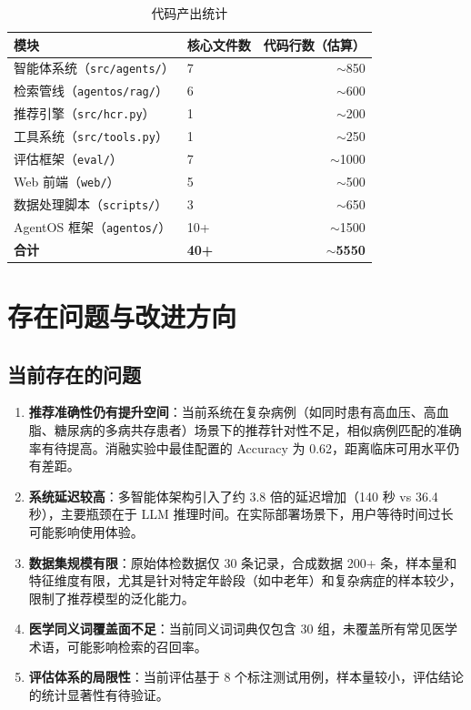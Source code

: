 \documentclass[12pt,a4paper]{article}
\begin{document}
\begin{table}[H]
    \centering
    \caption{代码产出统计}
    \label{tab:code}
    \begin{tabular}{llr}
        \toprule
        \textbf{模块} & \textbf{核心文件数} & \textbf{代码行数（估算）} \\
        \midrule
        智能体系统（\texttt{src/agents/}） & 7 & $\sim$850 \\
        检索管线（\texttt{agentos/rag/}） & 6 & $\sim$600 \\
        推荐引擎（\texttt{src/hcr.py}） & 1 & $\sim$200 \\
        工具系统（\texttt{src/tools.py}） & 1 & $\sim$250 \\
        评估框架（\texttt{eval/}） & 7 & $\sim$1000 \\
        Web 前端（\texttt{web/}） & 5 & $\sim$500 \\
        数据处理脚本（\texttt{scripts/}） & 3 & $\sim$650 \\
        AgentOS 框架（\texttt{agentos/}） & 10+ & $\sim$1500 \\
        \midrule
        \textbf{合计} & \textbf{40+} & \textbf{$\sim$5550} \\
        \bottomrule
    \end{tabular}
\end{table}




\section{存在问题与改进方向}
\label{sec:future}

\subsection{当前存在的问题}

\begin{enumerate}[leftmargin=2em]
    \item \textbf{推荐准确性仍有提升空间}：当前系统在复杂病例（如同时患有高血压、高血脂、糖尿病的多病共存患者）场景下的推荐针对性不足，相似病例匹配的准确率有待提高。消融实验中最佳配置的 Accuracy 为 0.62，距离临床可用水平仍有差距。
    \item \textbf{系统延迟较高}：多智能体架构引入了约 3.8 倍的延迟增加（140 秒 vs 36.4 秒），主要瓶颈在于 LLM 推理时间。在实际部署场景下，用户等待时间过长可能影响使用体验。
    \item \textbf{数据集规模有限}：原始体检数据仅 30 条记录，合成数据 200+ 条，样本量和特征维度有限，尤其是针对特定年龄段（如中老年）和复杂病症的样本较少，限制了推荐模型的泛化能力。
    \item \textbf{医学同义词覆盖面不足}：当前同义词词典仅包含 30 组，未覆盖所有常见医学术语，可能影响检索的召回率。
    \item \textbf{评估体系的局限性}：当前评估基于 8 个标注测试用例，样本量较小，评估结论的统计显著性有待验证。
\end{enumerate}
\end{document}
